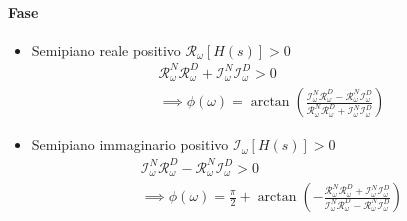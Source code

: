 \paragraph{Fase}
\begin{itemize}
\item Semipiano reale positivo $\mathcal{R}_{\omega}[H(s)] > 0$
  \begin{equation}
    \label{eq:da-tfunc-a-fase-reale-positivo}
    \begin{gathered}
      \mathcal{R}_{\omega}^N\mathcal{R}_{\omega}^D + \mathcal{I}_{\omega}^N\mathcal{I}_{\omega}^D > 0 \\ \implies
      \phi(\omega) = \arctan\left(\frac{\mathcal{I}_{\omega}^N\mathcal{R}_{\omega}^D - \mathcal{R}_{\omega}^N\mathcal{I}_{\omega}^D}{\mathcal{R}_{\omega}^N\mathcal{R}_{\omega}^D + \mathcal{I}_{\omega}^N\mathcal{I}_{\omega}^D}\right)
    \end{gathered}
  \end{equation}
\item Semipiano immaginario positivo $\mathcal{I}_{\omega}[H(s)] > 0$
  \begin{equation}
    \label{eq:da-tfunc-a-fase-immaginario-positivo}
    \begin{gathered}
      \mathcal{I}_{\omega}^N\mathcal{R}_{\omega}^D - \mathcal{R}_{\omega}^N\mathcal{I}_{\omega}^D > 0 \\ \implies
      \phi(\omega) = \frac{\pi}{2} + \arctan\left(-\frac{\mathcal{R}_{\omega}^N\mathcal{R}_{\omega}^D + \mathcal{I}_{\omega}^N\mathcal{I}_{\omega}^D}{\mathcal{I}_{\omega}^N\mathcal{R}_{\omega}^D - \mathcal{R}_{\omega}^N\mathcal{I}_{\omega}^D}\right)
    \end{gathered}
  \end{equation}


\end{itemize}
